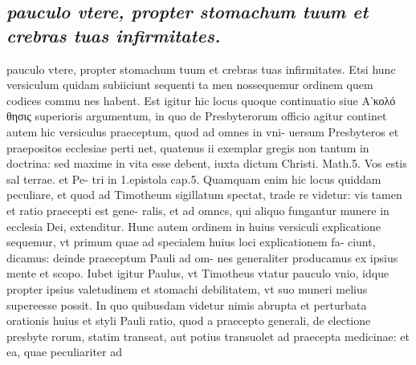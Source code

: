 \documentclass{article}
\begin{document}
\begin{pages}
\subsection*{\textit{pauculo vtere, propter stomachum tuum et crebras tuas infirmitates.}}pauculo vtere, propter stomachum tuum et crebras tuas infirmitates. Etsi hunc versiculum quidam subiiciunt sequenti ta men nossequemur ordinem quem codices commu nes habent. Est igitur hic locus quoque continuatio siue Α’κολό θησις superioris argumentum, in quo de Presbyterorum officio agitur continet autem hic versiculus praeceptum, quod ad omnes in vni- uersum Presbyteros et praepositos ecclesiae perti net, quatenus ii exemplar gregis non tantum in doctrina: sed maxime in vita esse debent, iuxta dictum Christi. Math.5. Vos estis sal terrae. et Pe- tri in 1.epistola cap.5. Quamquam enim hic locus quiddam peculiare, et quod ad Timotheum sigillatum spectat, trade re videtur: vis tamen et ratio praecepti est gene- ralis, et ad omncs, qui aliquo fungantur munere in ecclesia Dei, extenditur. Hunc autem ordinem in huius versiculi explicatione sequemur, vt primum quae ad specialem huius loci explicationem fa- ciunt, dicamus: deinde praeceptum Pauli ad om- nes generaliter producamus ex ipsius mente et scopo. Iubet igitur Paulus, vt Timotheus vtatur pauculo vnio, idque propter ipsius valetudinem et stomachi debilitatem, vt suo muneri melius supereesse possit. In quo quibusdam videtur nimis abrupta et perturbata orationis huius et styli Pauli ratio, quod a praecepto generali, de electione presbyte rorum, statim transeat, aut potius transuolet ad praecepta medicinae: et ea, quae peculiariter ad  \pend

\end{pages}
\end{document}
